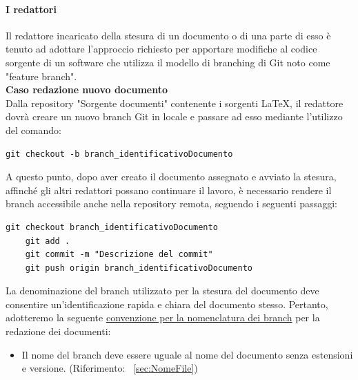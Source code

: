 \documentclass{article}
\begin{document}
    

    \paragraph{I redattori}

    Il redattore incaricato della stesura di un documento o di una parte di esso è tenuto ad adottare l'approccio richiesto per apportare modifiche al codice sorgente di un software che utilizza il modello di branching di Git noto come "feature branch".\\
    \vspace{0.1cm}
    \textbf{Caso redazione nuovo documento}\\
Dalla repository  "Sorgente documenti" contenente i sorgenti \LaTeX, il redattore dovrà creare un nuovo branch Git in locale e passare ad esso mediante l'utilizzo del comando:

    \begin{lstlisting}[style=code]
    git checkout -b branch_identificativoDocumento 
    \end{lstlisting}

    A questo punto, dopo aver creato il documento assegnato e avviato la stesura, affinché gli altri redattori possano continuare il lavoro, è necessario rendere il branch accessibile anche nella repository remota, seguendo i seguenti passaggi:        
        \begin{lstlisting}[style=code]
    git checkout branch_identificativoDocumento 
    git add .
    git commit -m "Descrizione del commit"
    git push origin branch_identificativoDocumento
        \end{lstlisting}
    La denominazione del branch utilizzato per la stesura del documento deve consentire un'identificazione rapida e chiara del documento stesso. Pertanto, adotteremo la seguente \underline{convenzione per la nomenclatura dei branch} per la redazione dei documenti:
    \begin{itemize}
        \item     Il nome del branch deve essere uguale al nome del documento senza estensioni e versione. (Riferimento: ~\ref{sec:NomeFile})
    \end{itemize}
\end{document}
